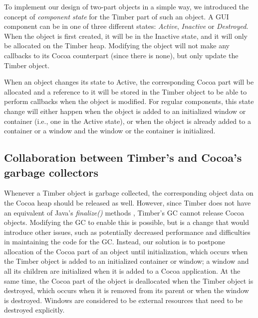 \documentclass[a4paper]{article}
\begin{document}
To implement our design of two-part objects in a simple way, we introduced the concept of \textit{component state} for the Timber part of such an object. A GUI component can be in one of three different states: \textit{Active}, \textit{Inactive} or \textit{Destroyed}. When the object is first created, it will be in the Inactive state, and it will only be allocated on the Timber heap. Modifying the object will not make any callbacks to its Cocoa counterpart (since there is none), but only update the Timber object.

When an object changes its state to Active, the corresponding Cocoa part will be allocated and a reference to it will be stored in the Timber object to be able to perform callbacks when the object is modified. For regular components, this state change will either happen when the object is added to an initialized window or container (i.e., one in the Active state), or when the object is already added to a container or a window and the window or the container is initialized.

\subsection{Collaboration between Timber's and Cocoa's garbage collectors}
Whenever a Timber object is garbage collected, the corresponding object data on the Cocoa heap should be released as well. However, since Timber does not have an equivalent of Java's \textit{finalize()} methods \cite{javaFinalize},  Timber's GC cannot release Cocoa objects. Modifying the GC to enable this is possible, but is a change that would introduce other issues, such as potentially decreased performance and difficulties in maintaining the code for the GC. Instead, our solution is to postpone allocation of the Cocoa part of an object until initialization, which occurs when the Timber object is added to an initialized container or window; a window and all its children are initialized when it is added to a Cocoa application. At the same time, the Cocoa part of the object is deallocated when the Timber object is destroyed, which occurs when it is removed from its parent or when the window is destroyed. Windows are considered to be external resources that need to be destroyed explicitly.
\end{document}
